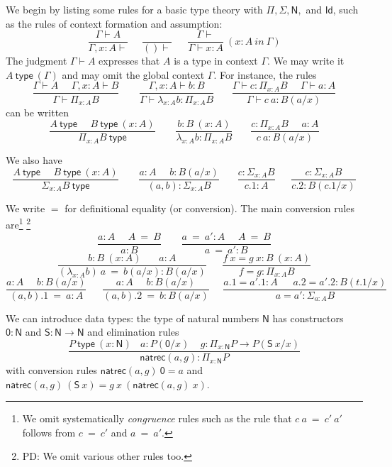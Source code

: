 \documentclass[11pt,a4paper]{article}
\theoremstyle{definition}
\newcommand{\Id}{\mathsf{Id}}
\newcommand{\conv}{=}
\def\NN{\mathsf{N}}
\def\ZERO{\mathsf{0}}
\def\SUCC{\mathsf{S}}
\newcommand{\type}{\mathsf{type}}
\newcommand{\mypi}[3]{\Pi_{#1:#2}#3}
\newcommand{\mylam}[3]{\lambda_{#1:#2}#3}
\newcommand{\mysig}[3]{\Sigma_{#1:#2}#3}
\newcommand{\N}{\mathsf{N}}
\newcommand{\natrec}{\mathsf{natrec}}
\begin{document}
We begin by listing some rules for a basic type theory with $\Pi, \Sigma, \N,$ and $\Id$, such as the rules of context formation and assumption:
$$
\frac{\Gamma\vdash A}{\Gamma,x:A\vdash}~~~~~~\frac{}{()\vdash}~~~~~~~
\frac{\Gamma\vdash}{\Gamma\vdash x:A}~(x\!:\! A~in~\Gamma)
$$
The judgment $\Gamma\vdash A$ expresses that $A$ is a type in context $\Gamma$.
We may write it $A~\type~(\Gamma)$ and may omit the global context $\Gamma$.
For instance, the rules
$$
\frac{\Gamma\vdash A~~~~~~\Gamma,x:A\vdash B}{\Gamma\vdash \mypi{x}{A}{B}}~~~~~~~~~
\frac{\Gamma,x:A\vdash b:B}{\Gamma\vdash \mylam{x}{A}{b}:\mypi{x}{A}{B}}~~~~~~~~
\frac{\Gamma\vdash c:\mypi{x}{A}{B}~~~~~~\Gamma\vdash a:A}
     {\Gamma\vdash c~a:B(a/x)}
$$
can be written
$$
\frac{A~\type~~~~~~B~\type~(x:A)}{\mypi{x}{A}{B}~\type}~~~~~~~~~
\frac{b:B~(x:A)}{\mylam{x}{A}{b}:\mypi{x}{A}{B}}~~~~~~~~
\frac{c:\mypi{x}{A}{B}~~~~~~a:A}
     {c~a:B(a/x)}
$$

We also have
$$
\frac{A~\type~~~~~~B~\type~(x:A)}{\mysig{x}{A}{B}~\type}~~~~~~~~~
\frac{a:A~~~~~~b:B(a/x)}{(a,b):\mysig{x}{A}{B}}~~~~~~~~
\frac{c:\mysig{x}{A}{B}}{c.1:A}~~~~~~~
\frac{c:\mysig{x}{A}{B}}{c.2:B(c.1/x)}
$$

We write $\conv$ for definitional equality (or conversion).
The main conversion rules are\footnote{We omit systematically {\em congruence} rules
  such as the rule that $c~a~\conv~c'~a'$ follows from $c~\conv~c'$ and $a~\conv~a'$.}
  \footnote{PD: We omit various other rules too.}
$$
\frac{ a:A~~~~~~ A~ \conv~ B}{ a:B}~~~~~~~~~
\frac{ a ~\conv~a':A~~~~~~ A  ~\conv~ B}{ a ~\conv~a':B}
$$
$$
\frac{b:B~(x:A)~~~~~~~~ a:A}{ (\mylam {x}{A}{b})~a  ~\conv~ b(a/x):B(a/x)}
~~~~~~~
\frac{f~x = g~x:B~(x:A)}{ f = g : \mypi{x}{A}{B}}
$$
$$
\frac{ a:A~~~~~~ b:B(a/x)}{ (a,b).1  ~\conv~ a:A}
~~~~~~~
\frac{ a:A~~~~~~ b:B(a/x)}{ (a,b).2  ~\conv~ b:B(a/x)}~~~~~~
\frac{ a.1 = a'.1:A~~~~~~~ a.2 = a'.2:B(t.1/x)}{ a = a' : \mysig{a}{A}{B}}
$$

We can introduce data types: the type of natural numbers $\NN$ has
constructors $\ZERO:\NN$ and $\SUCC:\NN\rightarrow\NN$ and elimination rules
$$
\frac{P~\type~(x:\NN)~~~~a:P(\ZERO/x)~~~~~g:\mypi{x}{\NN}{P\rightarrow P(\SUCC~x/x)}}{\natrec(a,g):\mypi{x}{\NN}{P}}
$$
with conversion rules $\natrec(a,g)~\ZERO = a$ and $\natrec(a,g)~(\SUCC~x) = g~x~(\natrec(a,g)~x)$.
\end{document}
